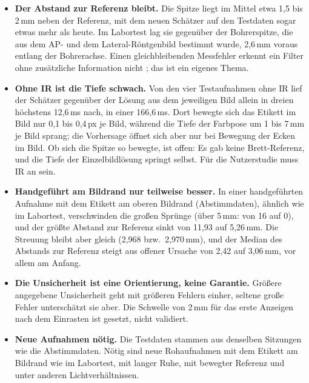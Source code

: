 \documentclass[11pt,a4paper,fleqn]{article}
\begin{document}
\begin{itemize}
  \item \textbf{Der Abstand zur Referenz bleibt.} Die Spitze liegt im Mittel etwa 1,5 bis 2\,mm neben
        der Referenz, mit dem neuen Schätzer auf den Testdaten sogar etwas mehr als heute. Im Labortest lag sie
        gegenüber der Bohrerspitze, die aus dem AP- und dem Lateral-Röntgenbild bestimmt wurde, 2,6\,mm
        voraus entlang der Bohrerachse. Einen gleichbleibenden Messfehler erkennt ein Filter ohne zusätzliche
        Information nicht \cite[§5.1.3]{barfoot2017state}; das ist ein eigenes Thema.
  \item \textbf{Ohne IR ist die Tiefe schwach.} Von den vier Testaufnahmen ohne IR lief der Schätzer gegenüber der
        Lösung aus dem jeweiligen Bild allein in dreien höchstens 12,6\,ms nach, in einer 166,6\,ms. Dort bewegte
        sich das Etikett im Bild nur 0,1 bis 0,4\,px je Bild, während die Tiefe der Farbpose um 1 bis 7\,mm je
        Bild sprang; die Vorhersage öffnet sich aber nur bei Bewegung der Ecken im Bild. Ob sich die
        Spitze so bewegte, ist offen: Es gab keine Brett-Referenz, und die Tiefe der Einzelbildlösung
        springt selbst. Für die Nutzerstudie muss IR an sein.
  \item \textbf{Handgeführt am Bildrand nur teilweise besser.} In einer handgeführten Aufnahme mit dem Etikett am
        oberen Bildrand (Abstimmdaten), ähnlich wie im Labortest, verschwinden die großen Sprünge (über 5\,mm: von
        16 auf 0), und der größte Abstand zur Referenz sinkt von 11,93 auf 5,26\,mm. Die Streuung bleibt aber
        gleich (2,968 bzw.\ 2,970\,mm), und der Median des Abstands zur Referenz steigt aus offener Ursache von
        2,42 auf 3,06\,mm, vor allem am Anfang.
  \item \textbf{Die Unsicherheit ist eine Orientierung, keine Garantie.} Größere angegebene Unsicherheit geht mit
        größeren Fehlern einher, seltene große Fehler unterschätzt sie aber. Die Schwelle von 2\,mm für das erste
        Anzeigen nach dem Einrasten ist gesetzt, nicht validiert.
  \item \textbf{Neue Aufnahmen nötig.} Die Testdaten stammen aus denselben Sitzungen wie die Abstimmdaten. Nötig
  sind neue Rohaufnahmen mit dem Etikett am
        Bildrand wie im Labortest, mit langer Ruhe, mit bewegter Referenz und unter anderen Lichtverhältnissen.
\end{itemize}

\end{document}
